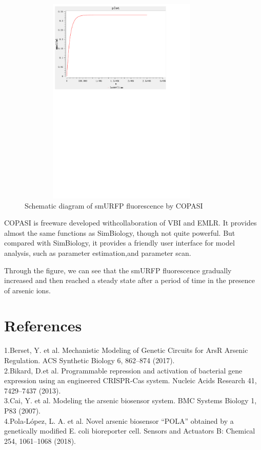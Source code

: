 \begin{figure}[h]
	\centering
	\includegraphics[width=10cm,height=10cm]{smuRFP}
	\caption{Schematic diagram of smURFP fluorescence by COPASI}
\end{figure}



COPASI is freeware developed withcollaboration of VBI and EMLR. It provides
almost the same functions as SimBiology, though not quite powerful. But compared with SimBiology, it provides a friendly user interface for model analysis, such as parameter estimation,and parameter scan.

Through the figure, we can see that the smURFP fluorescence gradually increased and then reached a steady state after a period of time  in the presence of arsenic ions.

\section{References} 
1.Berset, Y. et al. Mechanistic Modeling of Genetic Circuits for ArsR Arsenic Regulation. ACS Synthetic Biology 6, 862–874 (2017).\\

2.Bikard, D.et al. Programmable repression and activation of bacterial gene expression using an engineered CRISPR-Cas system. Nucleic Acids Research 41, 7429–7437 (2013).\\

3.Cai, Y. et al. Modeling the arsenic biosensor system. BMC Systems Biology 1, P83 (2007).\\

4.Pola-López, L. A. et al. Novel arsenic biosensor “POLA” obtained by a genetically modified E. coli bioreporter cell. Sensors and Actuators B: Chemical 254, 1061–1068 (2018).








